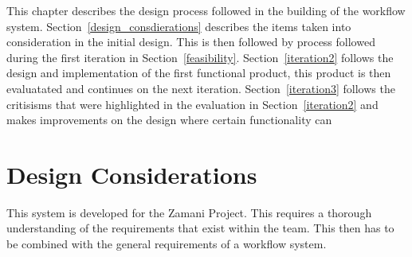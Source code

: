 \documentclass[12pt,a4paper]{report}
\begin{document}
\noindent This chapter describes the design process followed in the building
of the workflow system. Section~\ref{design_consdierations} describes
the items taken into consideration in the initial design. This is then
followed by process followed during the first iteration in Section~\ref{feasibility}.
Section~\ref{iteration2} follows the design and implementation of the
first functional product, this product is then evaluatated and continues
on the next iteration. Section~\ref{iteration3} follows the critisisms that
were highlighted in the evaluation in Section~\ref{iteration2} and makes
improvements on the design where certain functionality can


\section{Design Considerations\label{design_consdierations}}
This system is developed for the Zamani Project. This requires
a thorough understanding of the requirements that exist within
the team. This then has to be combined with the general requirements
of a workflow system.
\end{document}
